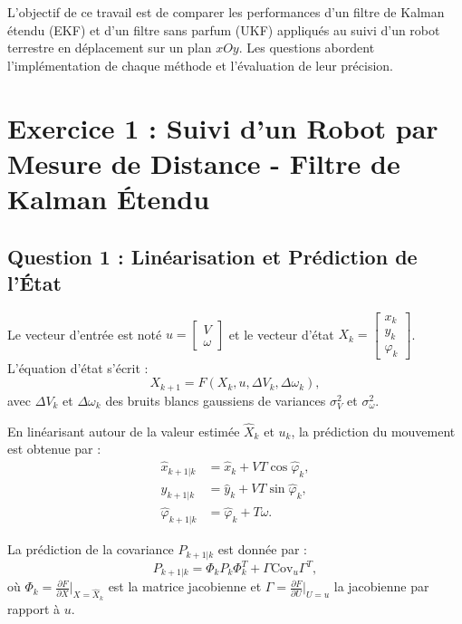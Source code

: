 L'objectif de ce travail est de comparer les performances d'un filtre de Kalman étendu (EKF) et d'un filtre sans parfum (UKF) appliqués au suivi d'un robot terrestre en déplacement sur un plan \(xOy\). Les questions abordent l'implémentation de chaque méthode et l'évaluation de leur précision.

\section{Exercice 1 : Suivi d'un Robot par Mesure de Distance - Filtre de Kalman Étendu}

\subsection{Question 1 : Linéarisation et Prédiction de l'État}
Le vecteur d'entrée est noté \( u = \begin{bmatrix} V \\ \omega \end{bmatrix} \) et le vecteur d'état \( X_k = \begin{bmatrix} x_k \\ y_k \\ \varphi_k \end{bmatrix} \). L'équation d'état s'écrit :
\begin{equation}
    X_{k+1} = F(X_k, u, \Delta V_k, \Delta \omega_k),
\end{equation}
avec \( \Delta V_k \) et \( \Delta \omega_k \) des bruits blancs gaussiens de variances \( \sigma_V^2 \) et \( \sigma_\omega^2 \).

En linéarisant autour de la valeur estimée \( \hat{X}_k \) et \( u_k \), la prédiction du mouvement est obtenue par :
\begin{align}
    \hat{x}_{k+1|k} &= \hat{x}_k + V T \cos \hat{\varphi}_k, \\
    \hat{y}_{k+1|k} &= \hat{y}_k + V T \sin \hat{\varphi}_k, \\
    \hat{\varphi}_{k+1|k} &= \hat{\varphi}_k + T \omega.
\end{align}

La prédiction de la covariance \( P_{k+1|k} \) est donnée par :
\begin{equation}
    P_{k+1|k} = \Phi_k P_k \Phi_k^T + \Gamma \text{Cov}_u \Gamma^T,
\end{equation}
où \( \Phi_k = \frac{\partial F}{\partial X} \big|_{X=\hat{X}_k} \) est la matrice jacobienne et \( \Gamma = \frac{\partial F}{\partial U} \big|_{U=u} \) la jacobienne par rapport à \( u \).

